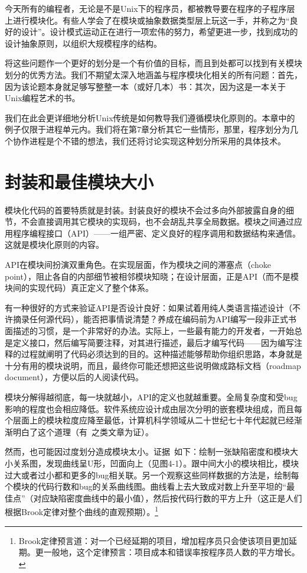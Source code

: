 \documentclass[12pt,oneside]{ctexbook}
\begin{document}
\begin{common-format}
今天所有的编程者，无论是不是Unix下的程序员，都被教导要在程序的子程序层上进行模块化。有些人学会了在模块或抽象数据类型层上玩这一手，并称之为“良好的设计”。设计模式运动正在进行一项宏伟的努力，希望更进一步，找到成功的设计抽象原则，以组织大规模程序的结构。

将这些问题作一个更好的划分是一个有价值的目标，而且到处都可以找到有关模块划分的优秀方法。我们不期望太深入地涵盖与程序模块化相关的所有问题：首先，因为该论题本身就足够写整整一本（或好几本）书：其次，因为这是一本关于Unix编程艺术的书。

我们在此会更详细地分析Unix传统是如何教导我们遵循模块化原则的。本章中的例子仅限于进程单元内。我们将在第7章分析其它一些情形，那里，程序划分为几个协作进程是个不错的想法，我们还将讨论实现这种划分所采用的具体技术。


\section{封装和最佳模块大小}
模块化代码的首要特质就是封装。封装良好的模块不会过多向外部披露自身的细节，不会直接调用其它模块的实现码，也不会胡乱共享全局数据。模块之间通过应用程序编程接口（API）——一组严密、定义良好的程序调用和数据结构来通信。这就是模块化原则的内容。

API在模块间扮演双重角色。在实现层面，作为模块之间的滞塞点（choke point），阻止各自的内部细节被相邻模块知晓；在设计层面，正是API（而不是模块间的实现代码）真正定义了整个体系。

有一种很好的方式来验证API是否设计良好：如果试着用纯人类语言描述设计（不许摘录任何源代码），能否把事情说清楚？养成在编码前为API编写一段非正式书面描述的习惯，是一个非常好的办法。实际上，一些最有能力的开发者，一开始总是定义接口，然后编写简要注释，对其进行描述，最后才编写代码——因为编写注释的过程就阐明了代码必须达到的目的。这种描述能够帮助你组织思路，本身就是十分有用的模块说明，而且，最终你可能还想把这些说明做成路标文档（roadmap document），方便以后的人阅读代码。

模块分解得越彻底，每一块就越小，API的定义也就越重要。全局复杂度和受bug影响的程度也会相应降低。软件系统应设计成由层次分明的嵌套模块组成，而且每个层面上的模块粒度应降至最低，计算机科学领域从二十世纪七十年代起就已经渐渐明白了这个道理（有~\cite{Parnas}之类文章为证）。

然而，也可能因过度划分造成模块太小。证据~\cite{Hatton97}如下：绘制一张缺陷密度和模块大小关系图，发现曲线呈U形，凹面向上（见图4-1）。跟中间大小的模块相比，模块过大或者过小都和更多的bug相关联。另一个观察这些同样数据的方法是，绘制每个模块的代码行数和bug的关系曲线图。曲线看上去大致成对数上升至平坦的“最佳点”（对应缺陷密度曲线中的最小值），然后按代码行数的平方上升（这正是人们根据Brook定律对整个曲线的直观预期）。\footnote{ Brook定律预言道：对一个已经延期的项目，增加程序员只会使该项目更加延期。更一般地，这个定律预言：项目成本和错误率按程序员人数的平方增长。}


\end{common-format}
\end{document}
